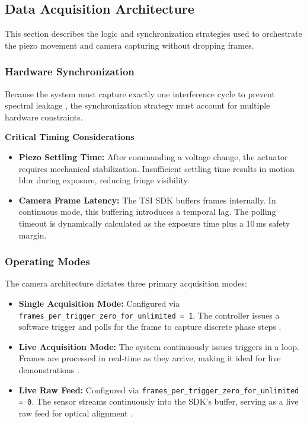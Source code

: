 \documentclass[12pt,a4paper]{article}
\begin{document}
    \subsection{Data Acquisition Architecture}
    This section describes the logic and synchronization strategies used to orchestrate the piezo movement and camera capturing without dropping frames.

        \subsubsection{Hardware Synchronization}
        Because the system must capture exactly one interference cycle to prevent spectral leakage \cite{SpectralLeakageEssentials}, the synchronization strategy must account for multiple hardware constraints.

        \textbf{Critical Timing Considerations} \\
        \begin{itemize}
            \item \textbf{Piezo Settling Time:} After commanding a voltage change, the actuator requires mechanical stabilization. Insufficient settling time results in motion blur during exposure, reducing fringe visibility.
            \item \textbf{Camera Frame Latency:} The \ac{TSI} \ac{SDK} buffers frames internally. In continuous mode, this buffering introduces a temporal lag. The polling timeout is dynamically calculated as the exposure time plus a 10\,ms safety margin.            
        \end{itemize}

        \subsubsection{Operating Modes}
        The camera architecture dictates three primary acquisition modes:
        \begin{itemize}
            \item \textbf{Single Acquisition Mode:} Configured via \texttt{frames\_per\_trigger\_zero\_for\_unlimited = 1}. The controller issues a software trigger and polls for the frame to capture discrete phase steps \cite{TSIDocs}.
            \item \textbf{Live Acquisition Mode:} The system continuously issues triggers in a loop. Frames are processed in real-time as they arrive, making it ideal for live demonstrations \cite{TSIGIT}.
            \item \textbf{Live Raw Feed:} Configured via \texttt{frames\_per\_trigger\_zero\_for\_unlimited = 0}. The sensor streams continuously into the \ac{SDK}'s buffer, serving as a live raw feed for optical alignment \cite{TSIGIT}.
        \end{itemize}
\end{document}

